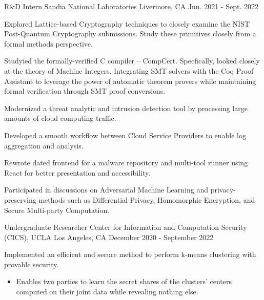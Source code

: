 

\begin{cventries}

  \cventry
    {R\&D Intern} %
    {Sandia National Laboratories} %
    {Livermore, CA} %
    {Jun. 2021 - Sept. 2022} %
    {
      \begin{cvitems} %
        \item{Explored Lattice-based Cryptography techniques to closely examine the NIST Post-Quantum Cryptography submissions. Study these primitives closely from a formal methods perspective.}
        \item{Studyied the formally-verified C compiler -- CompCert. Specfically, looked closely at the theory of Machine Integers. Integrating SMT solvers with the Coq Proof Assistant to leverage the power of automatic theorem provers while maintaining formal verification through SMT proof conversions. }
        \item{Modernized a threat analytic and intrusion detection tool by processing large amounts of cloud computing traffic.}
        \item{Developed a smooth workflow between Cloud Service Providers to enable log aggregation and analysis.}
        \item{Rewrote dated frontend for a malware repository and multi-tool runner using React for better presentation and accessibility.}
        \item{Participated in discussions on Adversarial Machine Learning and privacy-preserving methods such as Differential Privacy, Homomorphic Encryption, and Secure Multi-party Computation.}
      \end{cvitems}
    }

  \cventry
    {Undergraduate Researcher} %
    {Center for Information and Computation Security (CICS), UCLA} %
    {Los Angeles, CA} %
    {December 2020 - September 2022} %
    {
      \begin{cvitems} %
        \item{Implemented an efficient and secure method to perform k-means clustering with provable security.}
        \begin{itemize}
          \item{Enables two parties to learn the secret shares of the clusters' centers computed on their joint data while revealing nothing else.}
        \end{itemize}
      \end{cvitems}
    }


\end{cventries}
